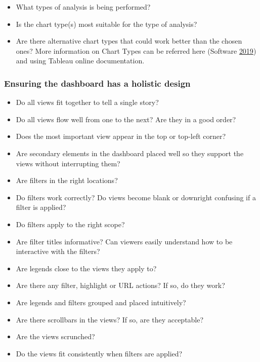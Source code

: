 \documentclass[]{book}
\providecommand{\tightlist}{%
  \setlength{\itemsep}{0pt}\setlength{\parskip}{0pt}}
\begin{document}
\begin{itemize}
\tightlist
\item
  What types of analysis is being performed?
\item
  Is the chart type(s) most suitable for the type of analysis?
\item
  Are there alternative chart types that could work better than the chosen ones?
  More information on Chart Types can be referred here (Software \protect\hyperlink{ref-analyze_viz}{2019}) and using Tableau online documentation.
\end{itemize}

\hypertarget{ensuring-the-dashboard-has-a-holistic-design}{%
\subsubsection{Ensuring the dashboard has a holistic design}\label{ensuring-the-dashboard-has-a-holistic-design}}

\begin{itemize}
\tightlist
\item
  Do all views fit together to tell a single story?
\item
  Do all views flow well from one to the next? Are they in a good order?
\item
  Does the most important view appear in the top or top-left corner?
\item
  Are secondary elements in the dashboard placed well so they support the views without interrupting them?
\item
  Are filters in the right locations?
\item
  Do filters work correctly? Do views become blank or downright confusing if a filter is applied?
\item
  Do filters apply to the right scope?
\item
  Are filter titles informative? Can viewers easily understand how to be interactive with the filters?
\item
  Are legends close to the views they apply to?
\item
  Are there any filter, highlight or URL actions? If so, do they work?
\item
  Are legends and filters grouped and placed intuitively?
\item
  Are there scrollbars in the views? If so, are they acceptable?
\item
  Are the views scrunched?
\item
  Do the views fit consistently when filters are applied?
\end{itemize}
\end{document}

